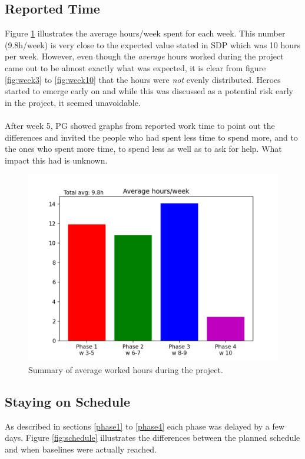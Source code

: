 \documentclass{article}
\begin{document}
    \subsection{Reported Time \label{reported_time}}
        Figure \ref{fig:final} illustrates the average hours/week spent for each week.
        This number (9.8h/week) is very close to the expected value stated in SDP which was 10
        hours per week. However, even though the \emph{average} hours worked during the project came out to be 
        almost exactly what was expected, it is clear from figure \ref{fig:week3} to \ref{fig:week10}
        that the hours were \emph{not} evenly distributed. Heroes started to emerge early
        on and while this was discussed as a potential risk early in the project, it seemed unavoidable.
        \\ \\
        After week 5, PG showed graphs from reported work time to point out the differences and 
        invited the people who had spent less time to spend more, and to the ones who spent more time,
        to spend less as well as to ask for help. What impact this had is unknown.
    
        \begin{figure}[!htb]
            \centering
              \includegraphics[width=\linewidth]{images/final.png}
              \caption{Summary of average worked hours during the project.}\label{fig:final}
            \endminipage\hfill
        \end{figure}

    \subsection{Staying on Schedule}
        As described in sections \ref{phase1} to \ref{phase4} each phase was
        delayed by a few days. Figure \ref{fig:schedule}
        illustrates the differences between the planned schedule and when
        baselines were actually reached.
        
\end{document}
